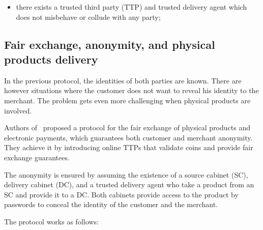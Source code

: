 \begin{itemize}
    \item there exists a trusted third party (TTP) and trusted delivery agent which does not misbehave or collude with any party;
\end{itemize}

\subsection{Fair exchange, anonymity, and physical products delivery} 
\label{anonymity-and-fair-exchange-in-e-commerce-protocol-for-physical-products-delivery}

In the previous protocol, the identities of both parties are known. There are however situations where the customer does not want to reveal his identity to the merchant. The problem gets even more challenging when physical products are involved.

Authors of~\cite{birjoveanuAnonymityFairexchangeEcommerce2015} proposed a protocol for the fair exchange of physical products and electronic payments, which guarantees both customer and merchant anonymity. They achieve it by introducing online TTPs that validate coins and provide fair exchange guarantees.

The anonymity is ensured by assuming the existence of a source cabinet (SC), delivery cabinet (DC), and a trusted delivery agent who take a product from an SC and provide it to a DC.
Both cabinets provide access to the product by passwords to conceal
the identity of the customer and the merchant.

The protocol works as follows: \begingroup
\renewcommand{\labelenumii}{\arabic{enumii}.}

